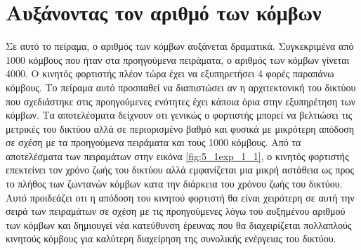 



















\section{Αυξάνοντας τον αριθμό των κόμβων}\label{sc:result6}
Σε αυτό το πείραμα, ο αριθμός των κόμβων αυξάνεται δραματικά. Συγκεκριμένα από 1000 κόμβους που ήταν στα προηγούμενα πειράματα, ο αριθμός των κόμβων γίνεται 4000. Ο
κινητός φορτιστής πλέον τώρα έχει να εξυπηρετήσει 4 φορές παραπάνω κόμβους. Το πείραμα αυτό προσπαθεί να διαπιστώσει αν η αρχιτεκτονική του δικτύου που σχεδιάστηκε
στις προηγούμενες ενότητες έχει κάποια όρια στην εξυπηρέτηση των κόμβων. Τα αποτελέσματα δείχνουν οτι γενικώς ο φορτιστής μπορεί να βελτιώσει τις μετρικές του
δικτύου αλλά σε περιορισμένο βαθμό και φυσικά με μικρότερη απόδοση σε σχέση με τα προηγούμενα πειράματα και τους 1000 κόμβους. Από τα αποτελέσματα των πειραμάτων
στην εικόνα \ref{fig:5_1exp_1_1}, ο κινητός φορτιστής επεκτείνει τον χρόνο ζωής του δικτύου αλλά εμφανίζεται μια μικρή
αστάθεια ως προς το πλήθος των ζωντανών κόμβων κατα την διάρκεια του χρόνου ζωής του δικτύου. Αυτό προιδεάζει οτι η απόδοση του κινητού φορτιστή θα είναι χειρότερη
σε αυτή την σειρά των πειραμάτων σε σχέση με τις προηγούμενες λόγω του αυξημένου αριθμού των κόμβων και δημιουγεί νέα κατεύθυνση έρευνας που θα διαχειρίζεται
πολλαπλούς κινητούς κόμβους για καλύτερη διαχείρηση της συνολικής ενέργειας του δικτύου.

